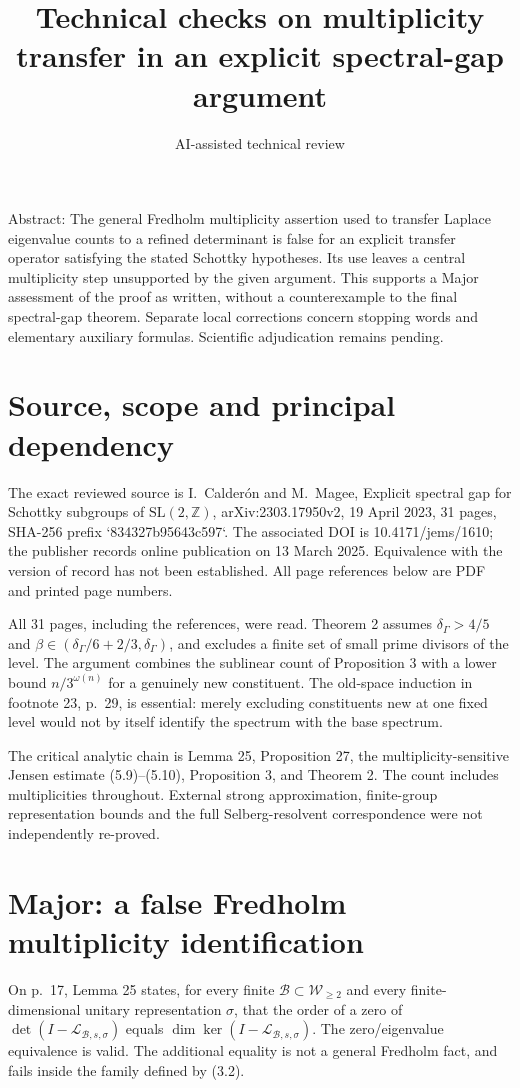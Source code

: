 \documentclass[10pt]{article}
\title{Technical checks on multiplicity transfer in an explicit spectral-gap argument}
\author{AI-assisted technical review}
\date{}
\begin{document}
\maketitle
Abstract: The general Fredholm multiplicity assertion used to transfer Laplace eigenvalue counts to a refined determinant is false for an explicit transfer operator satisfying the stated Schottky hypotheses. Its use leaves a central multiplicity step unsupported by the given argument. This supports a Major assessment of the proof as written, without a counterexample to the final spectral-gap theorem. Separate local corrections concern stopping words and elementary auxiliary formulas. Scientific adjudication remains pending.\par
\section*{Source, scope and principal dependency}
The exact reviewed source is I. Calderón and M. Magee, Explicit spectral gap for Schottky subgroups of \(\mathrm{SL}(2,\mathbb Z)\), arXiv:2303.17950v2, 19 April 2023, 31 pages, SHA-256 prefix `834327b95643c597`. The associated DOI is 10.4171/jems/1610; the publisher records online publication on 13 March 2025. Equivalence with the version of record has not been established. All page references below are PDF and printed page numbers.\par
All 31 pages, including the references, were read. Theorem 2 assumes \(\delta_\Gamma>4/5\) and \(\beta\in(\delta_\Gamma/6+2/3,\delta_\Gamma)\), and excludes a finite set of small prime divisors of the level. The argument combines the sublinear count of Proposition 3 with a lower bound \(n/3^{\omega(n)}\) for a genuinely new constituent. The old-space induction in footnote 23, p. 29, is essential: merely excluding constituents new at one fixed level would not by itself identify the spectrum with the base spectrum.\par
The critical analytic chain is Lemma 25, Proposition 27, the multiplicity-sensitive Jensen estimate (5.9)–(5.10), Proposition 3, and Theorem 2. The count includes multiplicities throughout. External strong approximation, finite-group representation bounds and the full Selberg-resolvent correspondence were not independently re-proved.\par
\section*{Major: a false Fredholm multiplicity identification}
On p. 17, Lemma 25 states, for every finite \(\mathcal B\subset\mathcal W_{\ge2}\) and every finite-dimensional unitary representation \(\sigma\), that the order of a zero of \(\det(I-\mathcal L_{\mathcal B,s,\sigma})\) equals \(\dim\ker(I-\mathcal L_{\mathcal B,s,\sigma})\). The zero/eigenvalue equivalence is valid. The additional equality is not a general Fredholm fact, and fails inside the family defined by (3.2).\par
\end{document}
